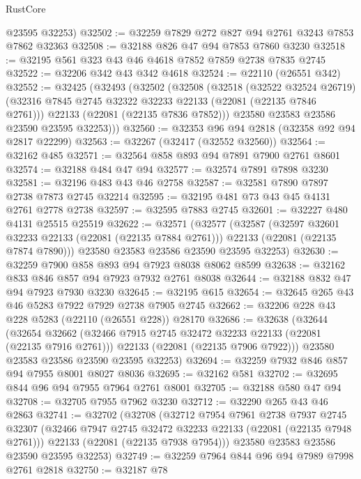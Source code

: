 \begin{lexlean}{RustCore}
\begin{coremodule}
      @23595
      @32253)
@32502 := @32259 @7829 @272 @827 @94 @2761 @3243 @7853 @7862 @32363
@32508 := @32188 @826 @47 @94 @7853 @7860 @3230
@32518 := @32195 @561 @323 @43 @46 @4618 @7852 @7859 @2738 @7835 @2745
@32522 := @32206 @342 @43 @342 @4618
@32524 := @22110 (@26551 @342)
@32552 := @32425
    (@32493
      (@32502
        (@32508
          (@32518
            (@32522 @32524 @26719)
            (@32316 @7845 @2745 @32322 @32233 @22133 (@22081 (@22135 @7846 @2761)))
            @22133
            (@22081 (@22135 @7836 @7852)))
          @23580
          @23583
          @23586
          @23590
          @23595
          @32253)))
@32560 := @32353 @96 @94 @2818 (@32358 @92 @94 @2817 @22299)
@32563 := @32267 (@32417 (@32552 @32560))
@32564 := @32162 @485
@32571 := @32564 @858 @893 @94 @7891 @7900 @2761 @8601
@32574 := @32188 @484 @47 @94
@32577 := @32574 @7891 @7898 @3230
@32581 := @32196 @483 @43 @46 @2758
@32587 := @32581 @7890 @7897 @2738 @7873 @2745 @32214
@32595 := @32195 @481 @73 @43 @45 @4131 @2761 @2778 @2738
@32597 := @32595 @7883 @2745
@32601 := @32227 @480 @4131 @25515 @25519
@32622 := @32571
    (@32577
      (@32587
        (@32597 @32601 @32233 @22133 (@22081 (@22135 @7884 @2761)))
        @22133
        (@22081 (@22135 @7874 @7890)))
      @23580
      @23583
      @23586
      @23590
      @23595
      @32253)
@32630 := @32259 @7900 @858 @893 @94 @7923 @8038 @8062 @8599
@32638 := @32162 @833 @846 @857 @94 @7923 @7932 @2761 @8038
@32644 := @32188 @832 @47 @94 @7923 @7930 @3230
@32645 := @32195 @615
@32654 := @32645 @265 @43 @46 @5283 @7922 @7929 @2738 @7905 @2745
@32662 := @32206 @228 @43 @228 @5283 (@22110 (@26551 @228)) @28170
@32686 := @32638
    (@32644
      (@32654
        @32662
        (@32466 @7915 @2745 @32472 @32233 @22133 (@22081 (@22135 @7916 @2761)))
        @22133
        (@22081 (@22135 @7906 @7922)))
      @23580
      @23583
      @23586
      @23590
      @23595
      @32253)
@32694 := @32259 @7932 @846 @857 @94 @7955 @8001 @8027 @8036
@32695 := @32162 @581
@32702 := @32695 @844 @96 @94 @7955 @7964 @2761 @8001
@32705 := @32188 @580 @47 @94
@32708 := @32705 @7955 @7962 @3230
@32712 := @32290 @265 @43 @46 @2863
@32741 := @32702
    (@32708
      (@32712
        @7954
        @7961
        @2738
        @7937
        @2745
        @32307
        (@32466 @7947 @2745 @32472 @32233 @22133 (@22081 (@22135 @7948 @2761)))
        @22133
        (@22081 (@22135 @7938 @7954)))
      @23580
      @23583
      @23586
      @23590
      @23595
      @32253)
@32749 := @32259 @7964 @844 @96 @94 @7989 @7998 @2761 @2818
@32750 := @32187 @78

\end{coremodule}
\end{lexlean}
